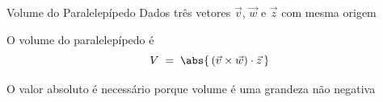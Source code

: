\documentclass[fleqn,aspectratio=169,12pt]{beamer}
\begin{document}
\begin{frame}{Volume do Paralelepípedo}
  Dados três vetores
  \(
    \vec{v}
  \),
  \(
    \vec{w}
  \) e
  \(
    \vec{z}
  \)
  com mesma origem

  \pause
  \bigskip
  O volume do paralelepípedo é
  \[
    V \;=\;
    \abs{\,\left( \vec{v}\times\vec{w} \right)\cdot\vec{z}\,}
  \]

  \pause
  \smallskip
  O valor absoluto é necessário porque volume é uma grandeza não negativa
\end{frame}




%
%

%
%

\end{document}
